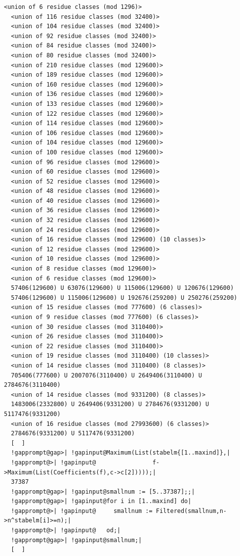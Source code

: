 \documentclass[a4paper,11pt]{report}
\begin{document}
{{\begin{Verbatim}[commandchars=!@|,fontsize=\small,frame=single,label=Example]
  <union of 6 residue classes (mod 1296)>
  <union of 116 residue classes (mod 32400)>
  <union of 104 residue classes (mod 32400)>
  <union of 92 residue classes (mod 32400)>
  <union of 84 residue classes (mod 32400)>
  <union of 80 residue classes (mod 32400)>
  <union of 210 residue classes (mod 129600)>
  <union of 189 residue classes (mod 129600)>
  <union of 160 residue classes (mod 129600)>
  <union of 136 residue classes (mod 129600)>
  <union of 133 residue classes (mod 129600)>
  <union of 122 residue classes (mod 129600)>
  <union of 114 residue classes (mod 129600)>
  <union of 106 residue classes (mod 129600)>
  <union of 104 residue classes (mod 129600)>
  <union of 100 residue classes (mod 129600)>
  <union of 96 residue classes (mod 129600)>
  <union of 60 residue classes (mod 129600)>
  <union of 52 residue classes (mod 129600)>
  <union of 48 residue classes (mod 129600)>
  <union of 40 residue classes (mod 129600)>
  <union of 36 residue classes (mod 129600)>
  <union of 32 residue classes (mod 129600)>
  <union of 24 residue classes (mod 129600)>
  <union of 16 residue classes (mod 129600) (10 classes)>
  <union of 12 residue classes (mod 129600)>
  <union of 10 residue classes (mod 129600)>
  <union of 8 residue classes (mod 129600)>
  <union of 6 residue classes (mod 129600)>
  57406(129600) U 63076(129600) U 115006(129600) U 120676(129600)
  57406(129600) U 115006(129600) U 192676(259200) U 250276(259200)
  <union of 15 residue classes (mod 777600) (6 classes)>
  <union of 9 residue classes (mod 777600) (6 classes)>
  <union of 30 residue classes (mod 3110400)>
  <union of 26 residue classes (mod 3110400)>
  <union of 22 residue classes (mod 3110400)>
  <union of 19 residue classes (mod 3110400) (10 classes)>
  <union of 14 residue classes (mod 3110400) (8 classes)>
  705406(777600) U 2007076(3110400) U 2649406(3110400) U 2784676(3110400)
  <union of 14 residue classes (mod 9331200) (8 classes)>
  1483006(2332800) U 2649406(9331200) U 2784676(9331200) U 5117476(9331200)
  <union of 16 residue classes (mod 27993600) (6 classes)>
  2784676(9331200) U 5117476(9331200)
  [  ]
  !gapprompt@gap>| !gapinput@Maximum(List(stabelm{[1..maxind]},|
  !gapprompt@>| !gapinput@                f->Maximum(List(Coefficients(f),c->c[2]))));|
  37387
  !gapprompt@gap>| !gapinput@smallnum := [5..37387];;|
  !gapprompt@gap>| !gapinput@for i in [1..maxind] do|
  !gapprompt@>| !gapinput@     smallnum := Filtered(smallnum,n->n^stabelm[i]>=n);|
  !gapprompt@>| !gapinput@   od;|
  !gapprompt@gap>| !gapinput@smallnum;|
  [  ]
  

\end{Verbatim}}}
\end{document}
